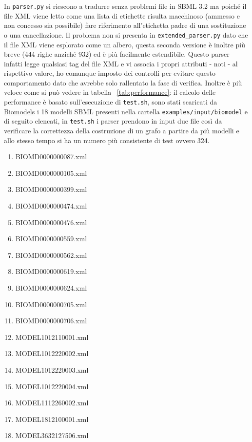 \documentclass{article}
\begin{document}
In \texttt{parser.py} si riescono a tradurre senza problemi file in SBML 3.2 ma poiché il file XML viene letto come una lista di etichette risulta macchinoso (ammesso e non concesso sia possibile) fare riferimento all'etichetta padre di una sostituzione o una cancellazione. Il problema non si presenta in \texttt{extended\_parser.py} dato che il file XML viene esplorato come un albero, questa seconda versione è inoltre più breve (444 righe anziché 932) ed è più facilmente estendibile. Questo parser infatti legge qualsiasi tag del file XML e vi associa i propri attributi - noti - al rispettivo valore, ho comunque imposto dei controlli per evitare questo comportamento dato che avrebbe solo rallentato la fase di verifica. Inoltre è più veloce come si può vedere in tabella ~\ref{tab:performance}: il calcolo delle performance è basato sull'esecuzione di \texttt{test.sh}, sono stati scaricati da \href{https://www.ebi.ac.uk/biomodels/}{Biomodels} i 18 modelli SBML presenti nella cartella \texttt{examples/input/biomodel} e di seguito elencati, in \texttt{test.sh} i parser prendono in input due file così da verificare la correttezza della costruzione di un grafo a partire da più modelli e allo stesso tempo si ha un numero più consistente di test ovvero 324. 

\begin{enumerate}
    \item BIOMD0000000087.xml
    \item BIOMD0000000105.xml
    \item BIOMD0000000399.xml
    \item BIOMD0000000474.xml
    \item BIOMD0000000476.xml
    \item BIOMD0000000559.xml
    \item BIOMD0000000562.xml
    \item BIOMD0000000619.xml
    \item BIOMD0000000624.xml
    \item BIOMD0000000705.xml
    \item BIOMD0000000706.xml
    \item MODEL1012110001.xml
    \item MODEL1012220002.xml
    \item MODEL1012220003.xml
    \item MODEL1012220004.xml
    \item MODEL1112260002.xml
    \item MODEL1812100001.xml
    \item MODEL3632127506.xml
\end{enumerate}
\end{document}
